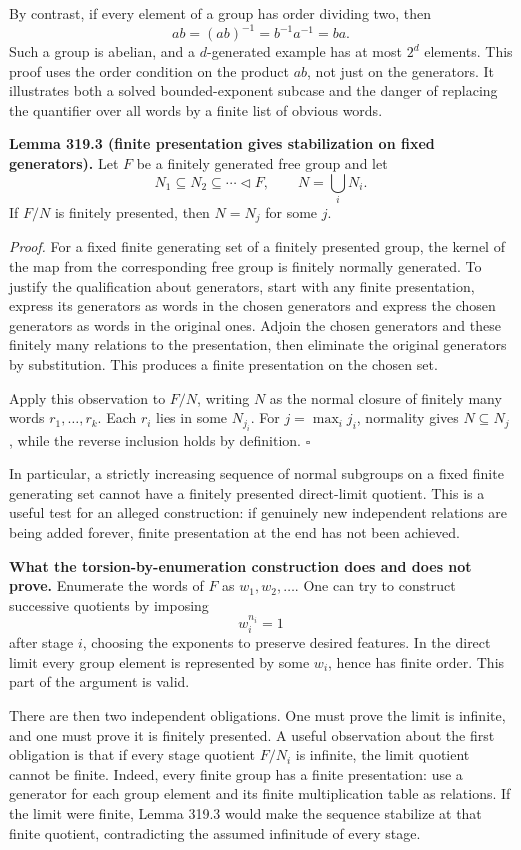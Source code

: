 \documentclass[11pt]{article}
\begin{document}
By contrast, if every element of a group has order dividing two, then
\[
 ab=(ab)^{-1}=b^{-1}a^{-1}=ba.
\]
Such a group is abelian, and a $d$-generated example has at most $2^d$ elements. This proof uses the order condition on the product $ab$, not just on the generators. It illustrates both a solved bounded-exponent subcase and the danger of replacing the quantifier over all words by a finite list of obvious words.

\textbf{Lemma 319.3 (finite presentation gives stabilization on fixed generators).} Let $F$ be a finitely generated free group and let
\[
 N_1\subseteq N_2\subseteq\cdots\lhd F,
 \qquad N=\bigcup_iN_i.
\]
If $F/N$ is finitely presented, then $N=N_j$ for some $j$.

\emph{Proof.} For a fixed finite generating set of a finitely presented group, the kernel of the map from the corresponding free group is finitely normally generated. To justify the qualification about generators, start with any finite presentation, express its generators as words in the chosen generators and express the chosen generators as words in the original ones. Adjoin the chosen generators and these finitely many relations to the presentation, then eliminate the original generators by substitution. This produces a finite presentation on the chosen set.

Apply this observation to $F/N$, writing $N$ as the normal closure of finitely many words $r_1,\ldots,r_k$. Each $r_i$ lies in some $N_{j_i}$. For $j=\max_i j_i$, normality gives $N\subseteq N_j$, while the reverse inclusion holds by definition. $\square$

In particular, a strictly increasing sequence of normal subgroups on a fixed finite generating set cannot have a finitely presented direct-limit quotient. This is a useful test for an alleged construction: if genuinely new independent relations are being added forever, finite presentation at the end has not been achieved.

\textbf{What the torsion-by-enumeration construction does and does not prove.} Enumerate the words of $F$ as $w_1,w_2,\ldots$. One can try to construct successive quotients by imposing
\[
 w_i^{n_i}=1
\]
after stage $i$, choosing the exponents to preserve desired features. In the direct limit every group element is represented by some $w_i$, hence has finite order. This part of the argument is valid.

There are then two independent obligations. One must prove the limit is infinite, and one must prove it is finitely presented. A useful observation about the first obligation is that if every stage quotient $F/N_i$ is infinite, the limit quotient cannot be finite. Indeed, every finite group has a finite presentation: use a generator for each group element and its finite multiplication table as relations. If the limit were finite, Lemma 319.3 would make the sequence stabilize at that finite quotient, contradicting the assumed infinitude of every stage.
\end{document}
